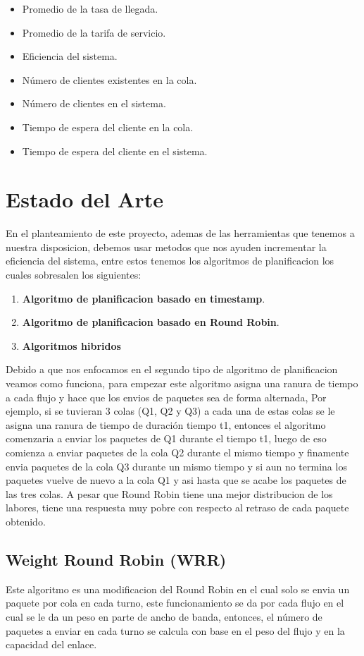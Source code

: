 \documentclass[conference,letterpaper]{IEEEtran}
\begin{document}
\begin{itemize}
    \item Promedio de la tasa de llegada.
    \item Promedio de la tarifa de servicio.
    \item Eficiencia del sistema.
    \item N\'umero de clientes existentes en la cola.
    \item N\'umero de clientes en el sistema.
    \item Tiempo de espera del cliente en la cola.
    \item Tiempo de espera del cliente en el sistema.
\end{itemize}

\section{Estado del Arte}
En el planteamiento de este proyecto, ademas de las herramientas que tenemos a nuestra disposicion, debemos usar metodos que nos ayuden incrementar la eficiencia del sistema, entre estos tenemos los algoritmos de planificacion los cuales sobresalen los siguientes:

\begin{enumerate}
    \item \textbf{Algoritmo de planificacion basado en timestamp}.
    \item \textbf{Algoritmo de planificacion basado en Round Robin}.
    \item \textbf{Algoritmos hibridos}
\end{enumerate}

Debido a que nos enfocamos en el segundo tipo de algoritmo de planificacion veamos como funciona, para empezar este algoritmo asigna una ranura de tiempo a cada flujo y hace que los envios de paquetes sea de forma alternada, Por ejemplo, si se tuvieran 3 colas (Q1, Q2 y
Q3) a cada una de estas colas se le asigna una ranura de tiempo de duración tiempo t1, entonces el algoritmo comenzaria a enviar los paquetes de Q1 durante el tiempo t1, luego de eso comienza a enviar paquetes de la cola Q2 durante el mismo tiempo y finamente envia paquetes de la cola Q3 durante un mismo tiempo y si aun no termina los paquetes vuelve de nuevo a la cola Q1 y asi hasta que se acabe los paquetes de las tres colas. A pesar que Round Robin tiene una mejor distribucion de los labores, tiene una respuesta muy pobre con respecto al retraso de cada paquete obtenido.

\subsection{Weight Round Robin (WRR)}
Este algoritmo es una modificacion del Round Robin en el cual solo se envia un paquete por cola en cada turno, este funcionamiento se da por cada flujo en el cual se le da un peso en parte de ancho de banda, entonces, el número de paquetes a enviar en cada turno se calcula con base en el peso del flujo y en la capacidad del enlace.
\end{document}
